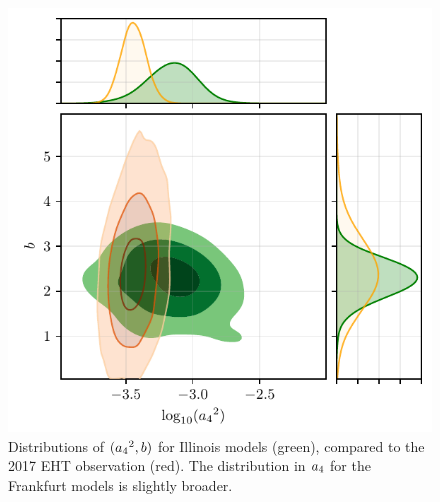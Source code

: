 

\begin{figure}
  \centering
  \includegraphics[width=\columnwidth]{./figures/grmhd_triangle_debiased_KHARMA.pdf}
  \caption{Distributions of $({a_4}^2,b)$ for Illinois models (green), compared to the 2017 EHT observation (red). The distribution in ${a_4}$ for the Frankfurt models is slightly broader.}
  \label{fig:cmp_VLBI_var}
\end{figure}

